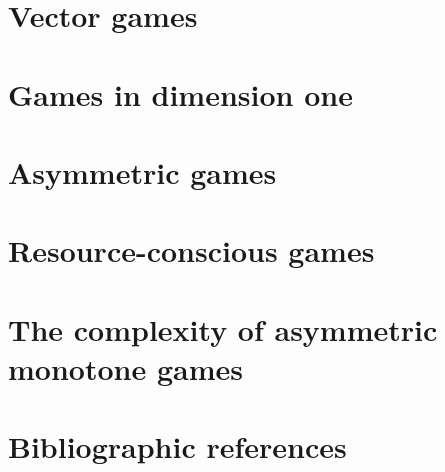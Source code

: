 \section{Vector games}
\label{11-sec:counters}


\section{Games in dimension one}
\label{11-sec:dim1}


\section{Asymmetric games}
\label{11-sec:avag}


\section{Resource-conscious games}
\label{11-sec:resource}


\section{The complexity of asymmetric monotone games}
\label{11-sec:complexity}


\section*{Bibliographic references}
\label{11-sec:references}


\ifstandalone{}\fi%



